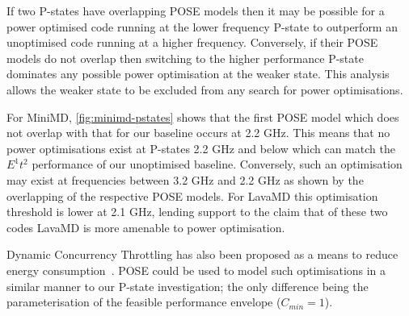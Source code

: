 \noindent
If two P-states have overlapping POSE models then it may be possible for a power optimised code running at the lower frequency P-state to outperform an unoptimised code running at a higher frequency.
Conversely, if their POSE models do not overlap then switching to the higher performance P-state dominates any possible power optimisation at the weaker state.
This analysis allows the weaker state to be excluded from any search for power optimisations.

For MiniMD, \autoref{fig:minimd-pstates} shows that the first POSE model which does not overlap with that for our baseline occurs at 2.2 GHz.
This means that no power optimisations exist at P-states 2.2 GHz and below which can match the $E^1t^2$ performance of our unoptimised baseline.
Conversely, such an optimisation may exist at frequencies between 3.2 GHz and 2.2 GHz as shown by the overlapping of the respective POSE models.
For LavaMD this optimisation threshold is lower at 2.1 GHz, lending support to the claim that of these two codes LavaMD is more amenable to power optimisation.

Dynamic Concurrency Throttling has also been proposed as a means to reduce energy consumption~\cite{maury:2006aa}.
POSE could be used to model such optimisations in a similar manner to our P-state investigation; the only difference being the parameterisation of the feasible performance envelope ($C_{min}=1$).
